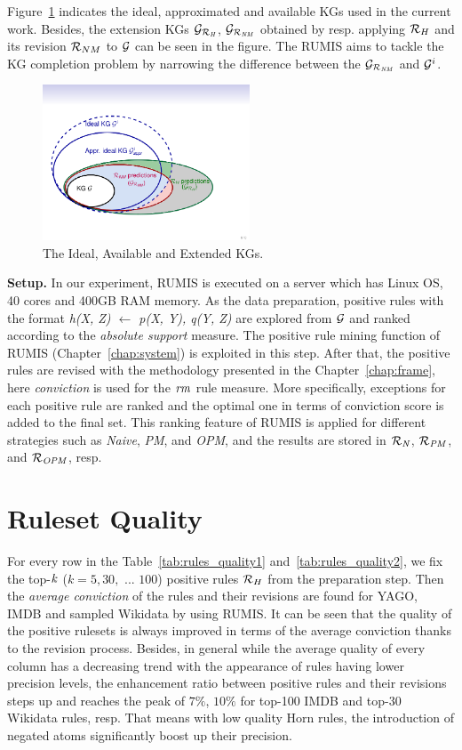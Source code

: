Figure~\ref{fig:venn} indicates the ideal, approximated and available KGs used in the current work. Besides, the extension KGs $\mathcal{G}_{\mathcal{R}_{\mathit{H}}}$, $\mathcal{G}_{\mathcal{R}_{\mathit{NM}}}$ obtained by resp. applying $\mathcal{R}_H$ and its revision $\mathcal{R}_{NM}$ to $\mathcal{G}$ can be seen in the figure. The RUMIS aims to tackle the KG completion problem by narrowing the difference between the $\mathcal{G}_{\mathcal{R}_{\mathit{NM}}}$ and $ \mathcal{G}^i$.

\begin{figure}[ht]
\centering
\includegraphics[width=0.55\textwidth]{figures/big_pic_exp}
\caption{The Ideal, Available and Extended KGs.}
\label{fig:venn}
\end{figure}

\textbf{Setup.} In our experiment, RUMIS is executed on a server which has Linux OS, 40 cores and 400GB RAM memory. As the data preparation, positive rules with the format \textit{h(X, Z) $\leftarrow$ p(X, Y), q(Y, Z)} are explored from $\mathcal{G}$ and ranked according to the \textit{absolute support} measure. The positive rule mining function of RUMIS (Chapter~\ref{chap:system}) is exploited in this step. After that, the positive rules are revised with the methodology presented in the Chapter~\ref{chap:frame}, here \textit{conviction} is used for the $\mathit{rm}$ rule measure. More specifically, exceptions for each positive rule are ranked and the optimal one in terms of conviction score is added to the final set. This ranking feature of RUMIS is applied for different strategies such as \emph{Naive}, \emph{PM}, and \emph{OPM}, and the results are stored in $\mathit{\mathcal{R}_{N}}$, $\mathit{\mathcal{R}_{PM}}$, and $\mathit{\mathcal{R}_{OPM}}$, resp.

\section{Ruleset Quality}

For every row in the Table~\ref{tab:rules_quality1} and~\ref{tab:rules_quality2}, we fix the top-$\mathit{k}$ ($k=5,30,$ ... $100$) positive rules $\mathcal{R}_{H}$ from the preparation step. Then the \textit{average conviction} of the rules and their revisions are found for YAGO, IMDB and sampled Wikidata by using RUMIS. It can be seen that the quality of the positive rulesets is always improved in terms of the average conviction thanks to the revision process. Besides, in general while the average quality of every column has a decreasing trend with the appearance of rules having lower precision levels, the enhancement ratio between positive rules and their revisions steps up and reaches the peak of $7\%$, $10\%$ for top-100 IMDB and top-30 Wikidata rules, resp. That means with low quality Horn rules, the introduction of negated atoms significantly boost up their precision.


